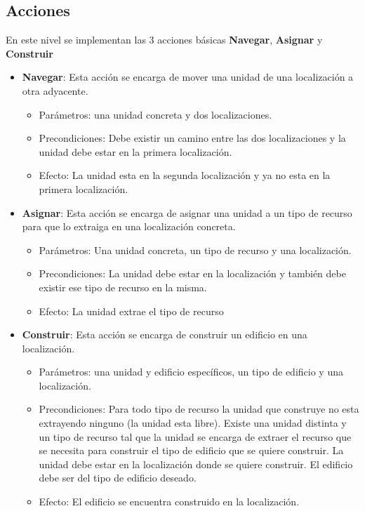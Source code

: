 \subsection{Acciones}
En este nivel se implementan las 3 acciones básicas \textbf{Navegar}, \textbf{Asignar} y \textbf{Construir}
\begin{itemize}
   \item \textbf{Navegar}: Esta acción se encarga de mover una unidad de una localización a otra adyacente.
      \begin{itemize}
         \item Parámetros: una unidad concreta y dos localizaciones.
         \item Precondiciones: Debe existir un camino entre las dos localizaciones y la unidad debe estar en la primera localización.
         \item Efecto: La unidad esta en la segunda localización y ya no esta en la primera localización.
      \end{itemize}
   \item \textbf{Asignar}: Esta acción se encarga de asignar una unidad a un tipo de recurso para que lo extraiga en una localización concreta.
   \begin{itemize}
      \item Parámetros: Una unidad concreta, un tipo de recurso y una localización.
      \item Precondiciones: La unidad debe estar en la localización y también debe existir ese tipo de recurso en la misma.
      \item Efecto: La unidad extrae el tipo de recurso
   \end{itemize}
   \item \textbf{Construir}: Esta acción se encarga de construir un edificio en una localización.
   \begin{itemize}
      \item Parámetros: una unidad y edificio específicos, un tipo de edificio y una localización.
      \item Precondiciones: Para todo tipo de recurso la unidad que construye no esta extrayendo ninguno (la unidad esta libre). Existe una unidad distinta y un tipo de recurso tal que la unidad se encarga de extraer el recurso que se necesita para construir el tipo de edificio que se quiere construir. La unidad debe estar en la localización donde se quiere construir. El edificio debe ser del tipo de edificio deseado.
      \item Efecto: El edificio se encuentra construido en la localización.
   \end{itemize}
\end{itemize}
